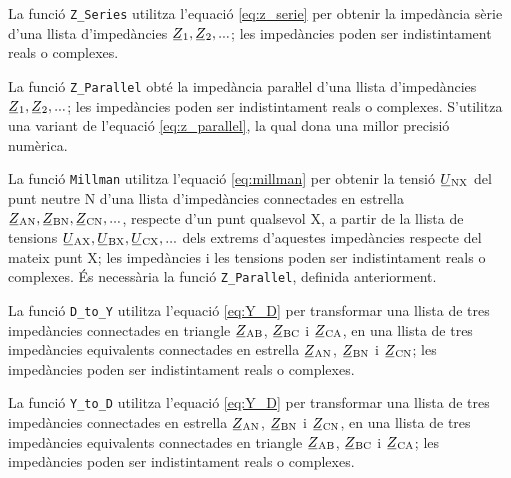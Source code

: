 La funció \texttt{Z\_Series} utilitza l'equació \eqref{eq:z_serie} per obtenir la impedància sèrie d'una llista d'impedàncies $\cmplx{Z}_1, \cmplx{Z}_2, ...$; les impedàncies poden ser indistintament reals o complexes.




La funció \texttt{Z\_Parallel} obté la impedància paraŀlel  d'una llista d'impedàncies $\cmplx{Z}_1, \cmplx{Z}_2, ...$; les impedàncies poden ser indistintament reals o complexes. S'utilitza una variant de l'equació \eqref{eq:z_parallel}, la qual dona una millor precisió numèrica.




La funció \texttt{Millman} utilitza l'equació \eqref{eq:millman} per obtenir la tensió $\cmplx{U}\ped{NX}$ del punt neutre N d'una llista d'impedàncies connectades en estrella $\cmplx{Z}\ped{AN}, \cmplx{Z}\ped{BN}, \cmplx{Z}\ped{CN}, ...$, respecte d'un punt qualsevol X, a partir de la llista de tensions $\cmplx{U}\ped{AX}, \cmplx{U}\ped{BX}, \cmplx{U}\ped{CX}, ...$ dels extrems d'aquestes impedàncies respecte del mateix punt X; les impedàncies i les tensions poden ser indistintament reals o complexes. És necessària la funció \texttt{Z\_Parallel}, definida anteriorment.




La funció \texttt{D\_to\_Y} utilitza l'equació \eqref{eq:Y_D} per transformar una llista de tres impedàncies connectades en triangle $\cmplx{Z}\ped{AB}$, $\cmplx{Z}\ped{BC}$ i  $\cmplx{Z}\ped{CA}$, en una llista de tres impedàncies equivalents connectades en estrella $\cmplx{Z}\ped{AN}$, $\cmplx{Z}\ped{BN}$ i $\cmplx{Z}\ped{CN}$; les impedàncies poden ser indistintament reals o complexes.




La funció \texttt{Y\_to\_D} utilitza l'equació \eqref{eq:Y_D} per transformar una llista de tres impedàncies connectades en estrella $\cmplx{Z}\ped{AN}$, $\cmplx{Z}\ped{BN}$ i $\cmplx{Z}\ped{CN}$, en una llista de tres impedàncies equivalents connectades en triangle $\cmplx{Z}\ped{AB}$, $\cmplx{Z}\ped{BC}$ i  $\cmplx{Z}\ped{CA}$; les impedàncies poden ser indistintament reals o complexes.

